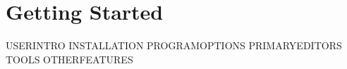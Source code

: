\section{Getting Started}\label{gettingStarted}

USERINTRO INSTALLATION PROGRAMOPTIONS PRIMARYEDITORS TOOLS OTHERFEATURES
